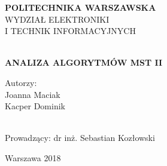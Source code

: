 \thispagestyle{empty}
\setlength{\unitlength}{1mm}

	\begin{center}	
	
	\LARGE{\textbf{POLITECHNIKA WARSZAWSKA}}\\[9ex]
	\LARGE{WYDZIAŁ ELEKTRONIKI \\I TECHNIK INFORMACYJNYCH}\\
	\par\noindent\\[.18 \textheight]
	\textbf{\Large{ANALIZA ALGORYTMÓW MST II}}\\[18ex]
	\raggedleft
	\begin{minipage}[l]{6cm}
	\large{Autorzy: \\Joanna Maciak\\Kacper Dominik}\\[.1ex]\\[9ex]
	\end{minipage}

	\centering
	\normalsize{Prowadzący: dr inż. Sebastian Kozłowski }
	\vfill

\end{center}
\begin{center}
	\large{Warszawa 2018}
\end{center}

